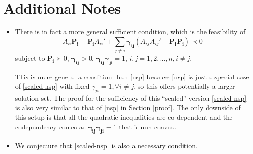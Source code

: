 \documentclass{article}
\begin{document}
\section{Additional Notes}
\begin{itemize}
  \item There is in fact a more general sufficient condition, which is the feasibility of 
\begin{equation}\label{scaled-nsp}
A_{ii}\pmb{P_i}+\pmb{P_i}A_{ii}'+\sum\limits_{j \neq i}\pmb{\gamma_{ij}}(A_{ij}A_{ij}'+\pmb{P_i}\pmb{P_i})\prec 0
\end{equation} subject to $\pmb{P_i} \succ 0$, $\pmb{\gamma_{ij}}>0$, $\pmb{\gamma_{ij}}\pmb{\gamma_{ji}}=1$, $i,j=1,2,\dots,n, i\neq j$. 

This is more general a condition than \eqref{nsp} because \eqref{nsp} is just a special case of \eqref{scaled-nsp} with fixed $\gamma_{ji}=1,\forall i\neq j$, so this offers potentially a larger solution set. The proof for the sufficiency of this ``scaled'' version \eqref{scaled-nsp} is also very similar to that of \eqref{nsp} in Section \ref{proof}. The only downside of this setup is that all the quadratic inequalities are co-dependent and the codependency comes as $\pmb{\gamma_{ij}}\pmb{\gamma_{ji}}=1$ that is non-convex. \\
  \item We conjecture that \eqref{scaled-nsp} is also a necessary condition. 
\end{itemize}



\end{document}
